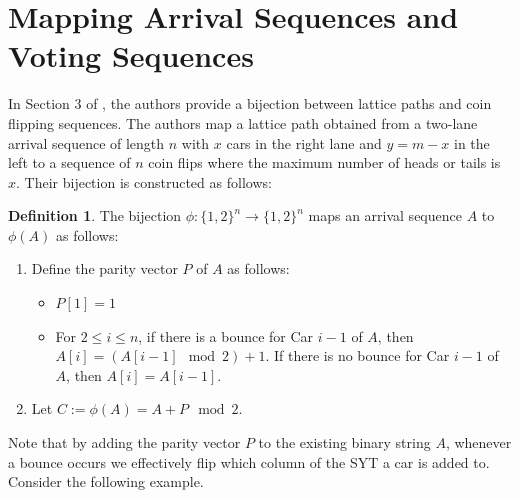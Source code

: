 \documentclass[article]{amsart}
\theoremstyle{plain}
\theoremstyle{definition}
\newtheorem{definition}{Definition}
\begin{document}
\section{Mapping Arrival Sequences and Voting Sequences} \label{sec:map}
In Section 3 of \cite{bard}, the authors provide a bijection between lattice paths and coin flipping sequences. The authors map a lattice path obtained from a two-lane arrival sequence of length $n$ with $x$ cars in the right lane and $y = m-x$ in the left to a sequence of $n$ coin flips where the maximum number of heads or tails is $x$. Their bijection is constructed as follows:

\begin{definition}
    The bijection $\phi: \{1,2\}^n \to \{1,2\}^n$ maps an arrival sequence $A$ to $\phi(A)$ as follows:
    \begin{enumerate}
        \item Define the parity vector $P$ of $A$ as follows:
        \begin{itemize}
            \item [(i)] $P[1] = 1$
    
            \item[(ii)] For $2 \leq i \leq n$, if there is a bounce for Car $i-1$ of $A$, then $A[i] = (A[i-1] \mod 2) + 1$. If there is no bounce for Car $i-1$ of $A$, then $A[i] = A[i-1]$.
        \end{itemize}

        \item Let $C := \phi(A) = A + P \mod 2$.

    \end{enumerate}
\end{definition}

Note that by adding the parity vector $P$ to the existing binary string $A$, whenever a bounce occurs we effectively flip which column of the SYT a car is added to. Consider the following example. 
\end{document}
